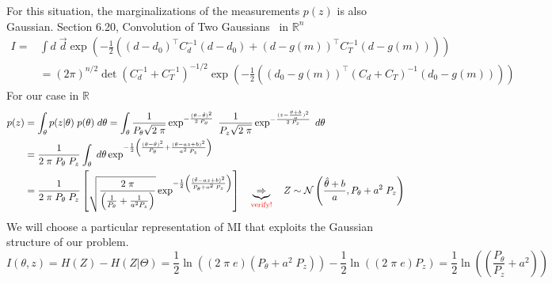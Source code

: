 \documentclass[10pt]{amsart}
\begin{document}
\begin{enumerate}
\begin{itemize}
For this situation, the marginalizations of the measurements $p(z)$
is also Gaussian.  
Section 6.20, Convolution of Two Gaussians~
\cite{tarantola05} in $\mathbb{R}^n$ 
\begin{equation} \label{TwoGaussConvolution}
\begin{split}
I = & \int d\;\vec{d} 
   \exp 
   \left(
    -\frac{1}{2}
   \left(
    (d-d_0)^\top
    C_d^{-1}
    (d-d_0)
    + 
    (d-g(m))^\top
    C_T^{-1}
    (d-g(m))
   \right)
   \right)
\\
  & = (2 \pi)^{n/2} \det(C_d^{-1}+ C_T^{-1})^{-1/2}
   \exp 
   \left(
    -\frac{1}{2}
   \left(
    (d_0-g(m))^\top
    (C_d + C_T)^{-1}
    (d_0-g(m))
   \right)
   \right)
\end{split}
\end{equation}
For our case in $\mathbb{R}$
\begin{equation} \label{toyzmarginalization} \begin{split}
p(z) & = \int_\theta p(z|\theta) \; p(\theta)\; d\theta 
       = \int_\theta 
      \frac{1}{P_\theta \sqrt{2\; \pi}} 
 \exp^{-\frac{(\theta -\hat{\theta})^2}{2 \; P_\theta}}
        \;
        \frac{1}{P_z \sqrt{2\; \pi}} 
 \exp^{-\frac{(z -\frac{\theta+b}{a})^2}{2 \; P_z}}
     \; d\theta 
\\
      & =
        \frac{1}{ 2\; \pi \;  P_\theta \; P_z  } 
         \int_\theta 
     \; d\theta 
 \exp^{- \frac {1}{2} \left( 
      \frac{(\theta -\hat{\theta})^2}{P_\theta}
     + \frac{(\theta - az +b)^2}{a^2 \; P_z}
      \right) }
\\
      & =
        \frac{1}{ 2\; \pi \;  P_\theta \; P_z  } 
         \left[
      \sqrt{ \frac{2\;\pi}{\left(\frac{1}{P_\theta} + \frac{1}{a^2 P_z} \right)}} 
      \exp^{- \frac {1}{2} \left( 
      \frac{(\hat{\theta} - az +b)^2}{P_\theta + a^2 \; P_z}
      \right) }
         \right]
     \quad \underbrace{\Rightarrow}_\text{\color{red} verify!} \quad
      Z \sim \mathcal{N}\left(\frac{\hat{\theta}+b}{a},P_\theta + a^2 \; P_z\right)
  \end{split} 
\end{equation}
We will choose a particular representation of MI that exploits the Gaussian
structure of our problem.
\begin{equation}\label{AnalyticMI}
  I(\theta,z) = H(Z) - H(Z|\Theta) 
      = 
           \frac{1}{2} \ln \left((2 \; \pi \; e)  \left(P_\theta + a^2 \;P_z\right)  \right) 
           -  \frac{1}{2} \ln \left((2 \; \pi \; e)  P_z \right) 
      = 
           \frac{1}{2} \ln \left(  \left( \frac{P_\theta}{P_z} + a^2 \right)  \right) 
\end{equation}


\end{itemize}
\end{enumerate}
\end{document}
